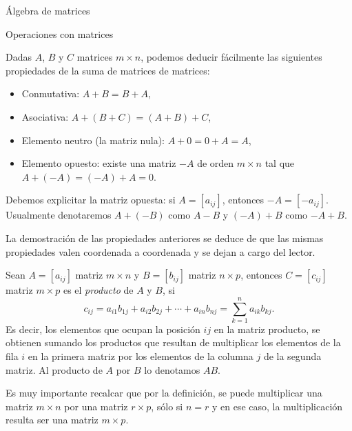 \begin{chapter}{\'Algebra de matrices}
\begin{section}{Operaciones con matrices}
                
                Dadas $A$, $B$ y $C$ matrices $m \times n$, podemos deducir fácilmente las siguientes propiedades de la suma de matrices de matrices:
                \begin{itemize}
                    \item Conmutativa: $A + B = B + A$,
                    \item Asociativa: $A + (B + C) = (A + B) + C$,
                    \item Elemento neutro (la matriz nula): $A + 0 = 0 + A = A$,
                    \item Elemento opuesto: existe una matriz $-A$ de orden $m \times n$ tal que  $A + (-A) = (-A) + A = 0$.
                \end{itemize}
                Debemos explicitar la matriz opuesta: si $A = [a_{ij}]$,  entonces $-A = [-a_{ij}]$. Usualmente denotaremos $A + (-B)$ como $A-B$ y $(-A)+B$ como $-A+B$. 
                
                La demostración de las propiedades anteriores se deduce de que las mismas propiedades valen coordenada a coordenada y se dejan a cargo del lector.         
            
                \begin{definicion}
                      Sean $A=[a_{ij}]$ matriz $m \times n$ y $B=[b_{ij}]$ matriz $n \times p$, entonces $C=[c_{ij}]$ matriz $m \times p$  es el \textit{producto} de $A$ y $B$, si 
                \begin{equation}\label{mtrx-mult}
                c_{ij} = a_{i1}b_{1j}+a_{i2}b_{2j}+\cdots+a_{in}b_{nj}= \sum_{k=1}^{n}a_{ik}b_{kj}.
                \end{equation}
                Es decir, los elementos que ocupan la posición $ij$ en la matriz producto, se obtienen sumando     los productos que resultan de multiplicar los elementos de la fila $i$ en la primera matriz por los
                elementos de la columna $j$ de la segunda matriz. Al producto de $A$ por $B$ lo denotamos $AB$. 
                \end{definicion}
            
                Es muy importante recalcar que por la definición, se puede multiplicar una matriz $m \times n$ por una matriz $r \times p$, sólo si $n=r$ y en ese caso, la multiplicación resulta ser una matriz $m \times p$. 


\end{section}
\end{chapter}
